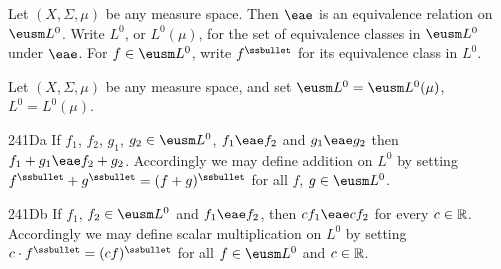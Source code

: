  Let $(X,\Sigma,\mu)$ be any
measure space.    Then $\eae$ is an equivalence relation on $\eusm L^0$.
Write $L^0$, or
$L^0(\mu)$, for the set of equivalence classes in $\eusm L^0$ under
$\eae$.   For $f\in\eusm L^0$, write $f^{\ssbullet}$ for its equivalence
class in $L^0$.

 Let $(X,\Sigma,\mu)$ be any
measure space, and set $\eusm L^0=\eusm L^0(\mu)$, $L^0=L^0(\mu)$.

\spheader 241Da If $f_1$, $f_2$, $g_1$, $g_2\in\eusm L^0$,
$f_1\eae f_2$ and
$g_1\eae g_2$ then $f_1+g_1\eae f_2+g_2$.   Accordingly we may define
addition on $L^0$ by setting
$f^{\ssbullet}+g^{\ssbullet}=(f+g)^{\ssbullet}$
for all $f$, $g\in\eusm L^0$.

\spheader 241Db If $f_1$, $f_2\in\eusm L^0$ and $f_1\eae f_2$,
then $cf_1\eae cf_2$ for every $c\in\Bbb R$.   Accordingly we may define
scalar multiplication on $L^0$ by setting
$c\cdot f^{\ssbullet}=(cf)^{\ssbullet}$ for
all $f\in\eusm L^0$ and $c\in\Bbb R$.


